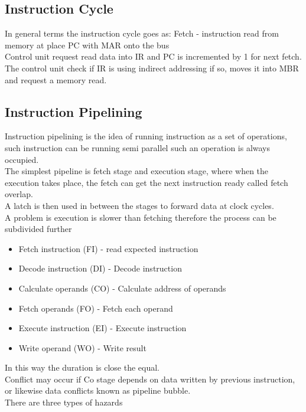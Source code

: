 \documentclass[12pt, a4paper]{article}
\begin{document}
		\subsection{Instruction Cycle}
			In general terms the instruction cycle goes as:
			Fetch - instruction read from memory at place PC with MAR onto the bus\\
			Control unit request read data into IR and PC is incremented by 1 for next fetch.\\
			The control unit check if IR is using indirect addressing if so, moves it into MBR and request a memory read.\\
		\subsection{Instruction Pipelining}
			Instruction pipelining is the idea of running instruction as a set of operations, such instruction can be running semi parallel such an operation is always occupied.\\
			The simplest pipeline is fetch stage and execution stage, where when the execution takes place, the fetch can get the next instruction ready called fetch overlap.\\
			A latch is then used in between the stages to forward data at clock cycles.\\
			A problem is execution is slower than fetching therefore the process can be subdivided further
			\begin{itemize}
				\item Fetch instruction (FI) - read expected instruction
				\item Decode instruction (DI) - Decode instruction
				\item Calculate operands (CO) - Calculate address of operands
				\item Fetch operands (FO) - Fetch each operand
				\item Execute instruction (EI) - Execute instruction
				\item Write operand (WO) - Write result
			\end{itemize}
			In this way the duration is close the equal.\\
			Conflict may occur if Co stage depends on data written by previous instruction, or likewise data conflicts known as pipeline bubble.\\
			There are three types of hazards
\end{document}
